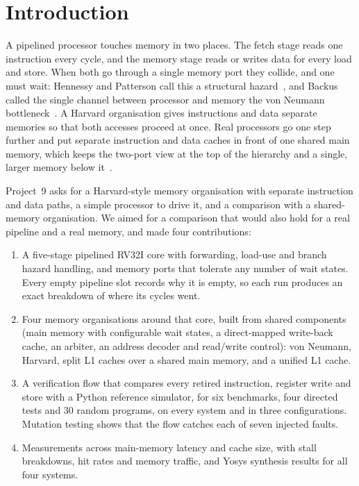 \documentclass[conference]{IEEEtran}
\begin{document}
\section{Introduction}

A pipelined processor touches memory in two places. The fetch stage reads one instruction every cycle, and the memory stage reads or writes data for every load and store. When both go through a single memory port they collide, and one must wait: Hennessy and Patterson call this a structural hazard~\cite{hp-quant}, and Backus called the single channel between processor and memory the von Neumann bottleneck~\cite{backus}. A Harvard organisation gives instructions and data separate memories so that both accesses proceed at once. Real processors go one step further and put separate instruction and data caches in front of one shared main memory, which keeps the two-port view at the top of the hierarchy and a single, larger memory below it~\cite{hp-quant,smith}.

Project~9 asks for a Harvard-style memory organisation with separate instruction and data paths, a simple processor to drive it, and a comparison with a shared-memory organisation. We aimed for a comparison that would also hold for a real pipeline and a real memory, and made four contributions:
\begin{enumerate}
    \item A five-stage pipelined RV32I core with forwarding, load-use and branch hazard handling, and memory ports that tolerate any number of wait states. Every empty pipeline slot records why it is empty, so each run produces an exact breakdown of where its cycles went.
    \item Four memory organisations around that core, built from shared components (main memory with configurable wait states, a direct-mapped write-back cache, an arbiter, an address decoder and read/write control): von Neumann, Harvard, split L1 caches over a shared main memory, and a unified L1 cache.
    \item A verification flow that compares every retired instruction, register write and store with a Python reference simulator, for six benchmarks, four directed tests and 30 random programs, on every system and in three configurations. Mutation testing shows that the flow catches each of seven injected faults.
    \item Measurements across main-memory latency and cache size, with stall breakdowns, hit rates and memory traffic, and Yosys synthesis results for all four systems.
\end{enumerate}
\end{document}
